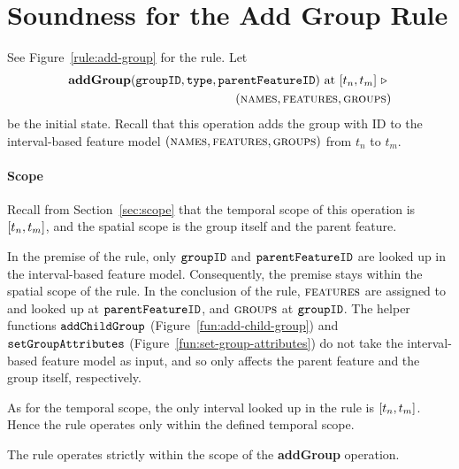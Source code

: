
\section{Soundness for the Add Group Rule}
\label{sec:soundness-for-the-add-group-rule}

See Figure~\vref{rule:add-group} for the  rule. 
Let 
\begin{equation*}
   \begin{split}
      \textbf{addGroup}(\var{groupID}, \var{type}, \var{parentFeatureID})\text{ at }\interval{t_n}{t_m}
      \shove \\
   (\names{}, \features{}, \groups{})
\end{split}
\end{equation*}
be the initial state. Recall that this operation adds the group with ID  to the interval-based feature model $(\textsc{names}{}, \textsc{features}{}, \textsc{groups}{}{})$ from $t_n$ to $t_m$. 

\paragraph{Scope}

Recall from Section~\vref{sec:scope} that the temporal scope of this operation is $\interval{t_n}{t_m}$, and the spatial scope is the group itself and the parent feature.

In the premise of the rule, only $\texttt{groupID}$ and $\texttt{parentFeatureID}$ are looked up in the interval-based feature model. Consequently, the premise stays within the spatial scope of the rule. In the conclusion of the rule, $\textsc{features}{}$ are assigned to and looked up at $\texttt{parentFeatureID}$, and $\textsc{groups}{}{}$ at $\texttt{groupID}$. The helper functions $\texttt{addChildGroup}$ (Figure~\vref{fun:add-child-group}) and $\texttt{setGroupAttributes}$ (Figure~\vref{fun:set-group-attributes}) do not take the interval-based feature model as input, and so only affects the parent feature and the group itself, respectively.

As for the temporal scope, the only interval looked up in the rule is $\interval{t_n}{t_m}$. Hence the rule operates only within the defined temporal scope.
\\

\begin{lemma}
   The  rule operates strictly within the scope of the \textbf{addGroup} operation.
   \label{lemma:add-group-scope}
\end{lemma}

